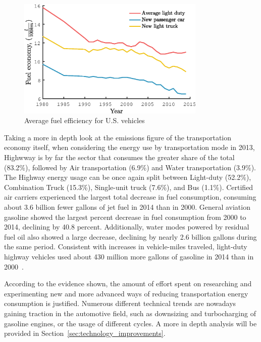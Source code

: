 \begin{figure}[ht]
  \centering
  \includegraphics[width=0.8\textwidth]{figures/introduction/average_fuel_efficiency.eps}
  \caption{Average fuel efficiency for U.S. vehicles \label{fig:average_fuel_efficiency} }
\end{figure}

Taking a more in depth look at the emissions figure of the transportation economy itself, when considering the energy use by transportation mode in 2013, Highwway is by far the sector that consumes the greater share of the total (83.2\%), followed by Air transportation (6.9\%) and Water transportation (3.9\%). The Highway energy usage can be once again split between Light-duty (52.2\%), Combination Truck (15.3\%), Single-unit truck (7.6\%), and Bus (1.1\%). Certified air carriers experienced the largest total decrease in fuel consumption, consuming about 3.6 billion fewer gallons of jet fuel in 2014 than in 2000. General aviation gasoline showed the largest percent decrease in fuel consumption from 2000 to 2014, declining by 40.8 percent. Additionally, water modes powered by residual fuel oil also showed a large decrease, declining by nearly 2.6 billion gallons during the same period. Consistent with increases in vehicle-miles traveled, light-duty highway vehicles used about 430 million more gallons of gasoline in 2014 than in 2000~\cite{BureauofTransportationStatistics2016a}.

According to the evidence shown, the amount of effort spent on researching and experimenting new and more advanced ways of reducing transportation energy consumption is justified. Numerous different technical trends are nowadays gaining traction in the automotive field, such as downsizing and turbocharging of gasoline engines, or the usage of different cycles. A more in depth analysis will be provided in Section~\ref{sec:technology_improvements}.

